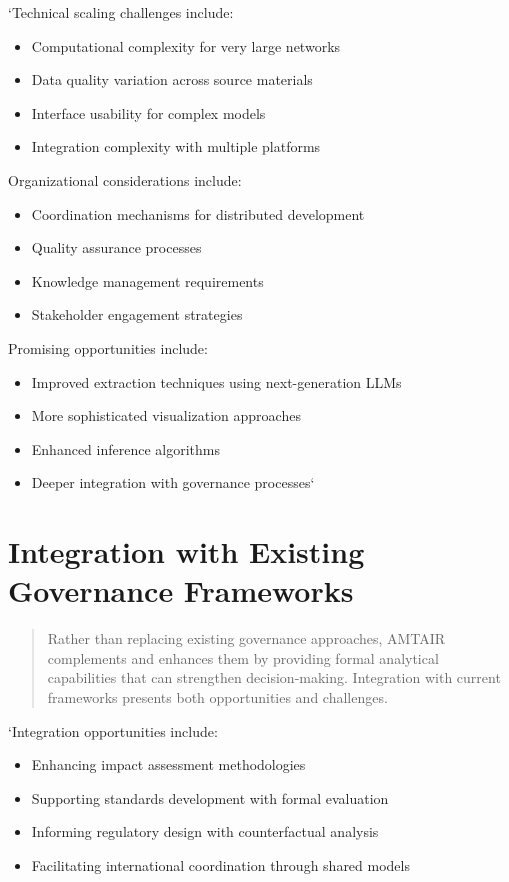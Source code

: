 \documentclass[12pt,a4paper]{report}
\providecommand{\tightlist}{%
  \setlength{\itemsep}{0pt}\setlength{\parskip}{0pt}}
\begin{document}
`Technical scaling challenges include:

\begin{itemize}
\tightlist
\item
  Computational complexity for very large networks
\item
  Data quality variation across source materials
\item
  Interface usability for complex models
\item
  Integration complexity with multiple platforms
\end{itemize}

Organizational considerations include:

\begin{itemize}
\tightlist
\item
  Coordination mechanisms for distributed development
\item
  Quality assurance processes
\item
  Knowledge management requirements
\item
  Stakeholder engagement strategies
\end{itemize}

Promising opportunities include:

\begin{itemize}
\tightlist
\item
  Improved extraction techniques using next-generation LLMs
\item
  More sophisticated visualization approaches
\item
  Enhanced inference algorithms
\item
  Deeper integration with governance processes`
\end{itemize}

\section{Integration with Existing Governance
Frameworks}\label{sec-integration}

\begin{quote}
Rather than replacing existing governance approaches, AMTAIR complements
and enhances them by providing formal analytical capabilities that can
strengthen decision-making. Integration with current frameworks presents
both opportunities and challenges.
\end{quote}

`Integration opportunities include:

\begin{itemize}
\tightlist
\item
  Enhancing impact assessment methodologies
\item
  Supporting standards development with formal evaluation
\item
  Informing regulatory design with counterfactual analysis
\item
  Facilitating international coordination through shared models
\end{itemize}
\end{document}
